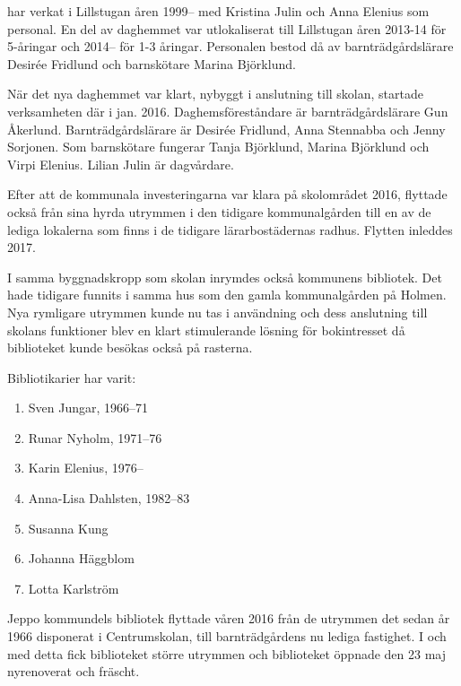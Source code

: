  har verkat i Lillstugan åren 1999-- med Kristina Julin och Anna Elenius som personal. En del av daghemmet var utlokaliserat till Lillstugan åren 2013-14 för 5-åringar och 2014-- för 1-3 åringar. Personalen bestod då av barnträdgårdslärare Desirée Fridlund och barnskötare Marina Björklund.

När det nya daghemmet var klart, nybyggt i anslutning till skolan, startade verksamheten där i jan. 2016. Daghemsföreståndare är barnträdgårdslärare Gun Åkerlund. Barnträdgårdslärare är Desirée Fridlund, Anna Stennabba och Jenny Sorjonen. Som barnskötare fungerar Tanja Björklund, Marina Björklund och Virpi Elenius. Lilian Julin är dagvårdare.

Efter att de kommunala investeringarna var klara på skolområdet 2016, flyttade också  från sina hyrda utrymmen i den tidigare kommunalgården till en av de lediga lokalerna som finns i de tidigare lärarbostädernas radhus. Flytten inleddes 2017.


I samma byggnadskropp som skolan inrymdes också kommunens bibliotek. Det hade tidigare funnits i samma hus som den gamla kommunalgården på Holmen. Nya rymligare utrymmen kunde nu tas i användning och dess anslutning till skolans funktioner blev en klart stimulerande lösning för bokintresset då biblioteket kunde besökas också på rasterna.

Bibliotikarier har varit:
\begin{enumerate}
  \item Sven Jungar, 1966--71
  \item Runar Nyholm, 1971--76
  \item Karin Elenius, 1976--
  \item Anna-Lisa Dahlsten, 1982--83
  \item Susanna Kung
  \item Johanna Häggblom
  \item Lotta Karlström
\end{enumerate}





Jeppo kommundels bibliotek flyttade våren 2016 från de utrymmen det sedan år 1966 disponerat i Centrumskolan, till barnträdgårdens nu lediga fastighet. I och med detta fick biblioteket större utrymmen och biblioteket öppnade den 23 maj nyrenoverat och fräscht.


